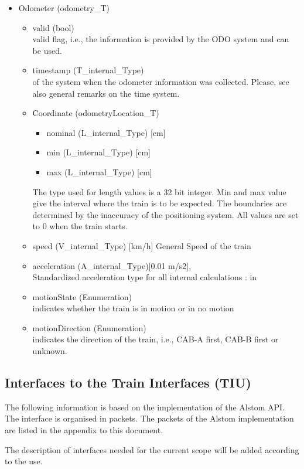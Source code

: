 \documentclass{template/openetcs_report}
\begin{document}
\begin{itemize}
\item Odometer (odometry\_T)
\begin{itemize}
\item valid (bool)\\
valid flag, i.e., the information is provided by the ODO system and can be used.
\item timestamp (T\_internal\_Type)\\
of the system when the odometer information was collected. Please, see also general remarks on the time system. 
\item Coordinate (odometryLocation\_T)
\begin{itemize}
\item nominal (L\_internal\_Type) [cm]
\item min (L\_internal\_Type) [cm]
\item max (L\_internal\_Type) [cm]
\end{itemize}
The type used for length values is a 32 bit integer. 
Min and max value give the interval where the train is to be expected. The boundaries are determined by the inaccuracy of the positioning system. All values are set to 0 when the train starts.
\item speed (V\_internal\_Type) [km/h]
General Speed of the train
\item acceleration (A\_internal\_Type)[0.01 m/s2],\\
Standardized acceleration type for all internal calculations : in 
\item motionState (Enumeration)\\
indicates whether the train is in motion or in no motion
\item motionDirection (Enumeration)\\
indicates the direction of the train, i.e., CAB-A first, CAB-B first or unknown.
\end{itemize}
\end{itemize}

\subsection{Interfaces to the Train Interfaces (TIU)}
The following information is based on the implementation of the Alstom API. The interface is organised in packets. The packets of the Alstom implementation are listed in the appendix to this document.

The description of interfaces needed for the current scope will be added according to the use.






\newpage
{}
\printindex
\end{document}
